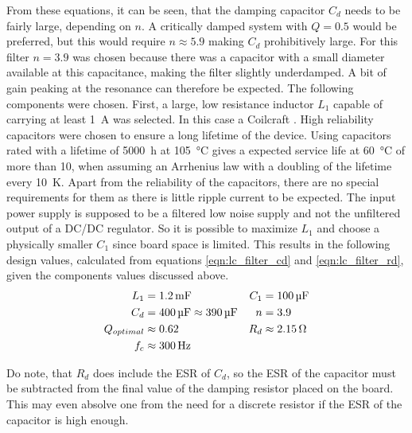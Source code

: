 From these equations, it can be seen, that the damping capacitor $C_d$ needs to be fairly large, depending on $n$. A critically damped system with $Q = \num{0.5}$ would be preferred, but this would require $n \approx 5.9$ making $C_d$ prohibitively large. For this filter $n=3.9$ was chosen because there was a capacitor with a small diameter available at this capacitance, making the filter slightly underdamped. A bit of gain peaking at the resonance can therefore be expected. The following components were chosen. First, a large, low resistance inductor $L_1$ capable of carrying at least \qty{1}{\A} was selected. In this case a Coilcraft . High reliability capacitors were chosen to ensure a long lifetime of the device. Using capacitors rated with a lifetime of \qty{5000}{\hour} at \qty{105}{\celsius} gives a expected service life at \qty{60}{\celsius} of more than \qty{10}{\year}, when assuming an Arrhenius law with a doubling of the lifetime every \qty{10}{\kelvin}. Apart from the reliability of the capacitors, there are no special requirements for them as there is little ripple current to be expected. The input power supply is supposed to be a filtered low noise supply and not the unfiltered output of a DC/DC regulator. So it is possible to maximize $L_1$ and choose a physically smaller $C_1$ since board space is limited. This results in the following design values, calculated from equations \ref{eqn:lc_filter_cd} and \ref{eqn:lc_filter_rd}, given the components values discussed above.
\begin{align*}
    L_1 &= \qty{1.2}{\mF} & C_1 &= \qty{100}{\uF}\\
    C_d &= \qty{400}{\uF} \approx \qty{390}{\uF} & n &= 3.9\\
    Q_{optimal} &\approx \num{0.62} & R_d & \approx \qty{2.15}{\ohm}\\
    f_c &\approx \qty{300}{\Hz}
\end{align*}

Do note, that $R_d$ does include the ESR of $C_d$, so the ESR of the capacitor must be subtracted from the final value of the damping resistor placed on the board. This may even absolve one from the need for a discrete resistor if the ESR of the capacitor is high enough.

